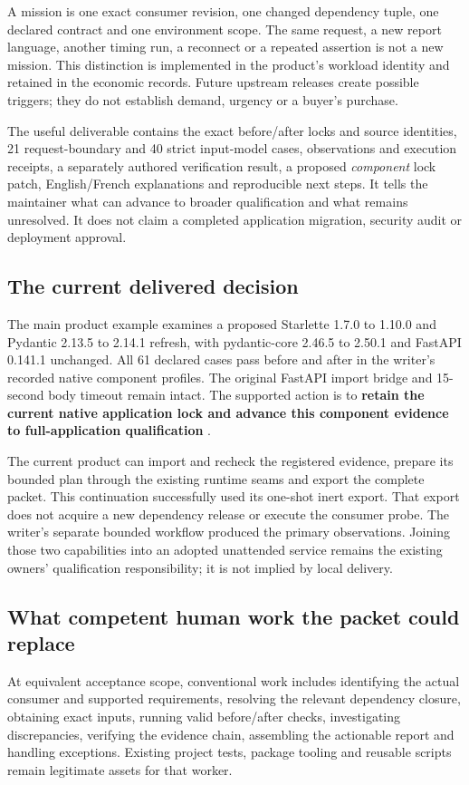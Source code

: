 \documentclass[11pt,letterpaper]{article}
\begin{document}
A mission is one exact consumer revision, one changed dependency tuple, one declared contract and one environment scope. The same request, a new report language, another timing run, a reconnect or a repeated assertion is not a new mission. This distinction is implemented in the product's workload identity and retained in the economic records. Future upstream releases create possible triggers; they do not establish demand, urgency or a buyer's purchase.

The useful deliverable contains the exact before/after locks and source identities, 21 request-boundary and 40 strict input-model cases, observations and execution receipts, a separately authored verification result, a proposed \emph{component} lock patch, English/French explanations and reproducible next steps. It tells the maintainer what can advance to broader qualification and what remains unresolved. It does not claim a completed application migration, security audit or deployment approval.

\subsection{The current delivered decision}
The main product example examines a proposed Starlette 1.7.0 to 1.10.0 and Pydantic 2.13.5 to 2.14.1 refresh, with pydantic-core 2.46.5 to 2.50.1 and FastAPI 0.141.1 unchanged. All 61 declared cases pass before and after in the writer's recorded native component profiles. The original FastAPI import bridge and 15-second body timeout remain intact. The supported action is to \textbf{retain the current native application lock and advance this component evidence to full-application qualification} \cite{usefulwork}.

The current product can import and recheck the registered evidence, prepare its bounded plan through the existing runtime seams and export the complete packet. This continuation successfully used its one-shot inert export. That export does not acquire a new dependency release or execute the consumer probe. The writer's separate bounded workflow produced the primary observations. Joining those two capabilities into an adopted unattended service remains the existing owners' qualification responsibility; it is not implied by local delivery.

\subsection{What competent human work the packet could replace}
At equivalent acceptance scope, conventional work includes identifying the actual consumer and supported requirements, resolving the relevant dependency closure, obtaining exact inputs, running valid before/after checks, investigating discrepancies, verifying the evidence chain, assembling the actionable report and handling exceptions. Existing project tests, package tooling and reusable scripts remain legitimate assets for that worker.
\end{document}

